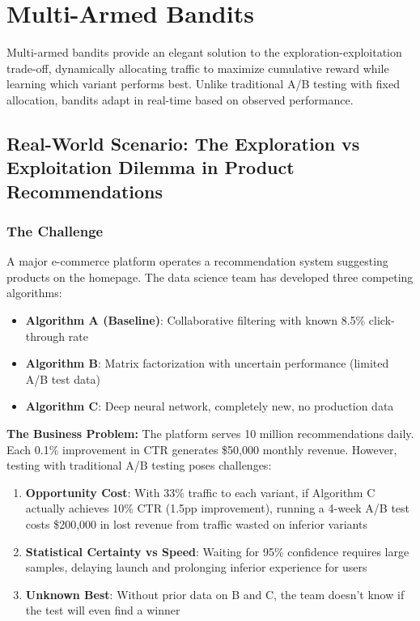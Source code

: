 \section{Multi-Armed Bandits}

Multi-armed bandits provide an elegant solution to the exploration-exploitation trade-off, dynamically allocating traffic to maximize cumulative reward while learning which variant performs best. Unlike traditional A/B testing with fixed allocation, bandits adapt in real-time based on observed performance.

\subsection{Real-World Scenario: The Exploration vs Exploitation Dilemma in Product Recommendations}

\subsubsection{The Challenge}

A major e-commerce platform operates a recommendation system suggesting products on the homepage. The data science team has developed three competing algorithms:

\begin{itemize}
    \item \textbf{Algorithm A (Baseline)}: Collaborative filtering with known 8.5\% click-through rate
    \item \textbf{Algorithm B}: Matrix factorization with uncertain performance (limited A/B test data)
    \item \textbf{Algorithm C}: Deep neural network, completely new, no production data
\end{itemize}

\textbf{The Business Problem:} The platform serves 10 million recommendations daily. Each 0.1\% improvement in CTR generates \$50,000 monthly revenue. However, testing with traditional A/B testing poses challenges:

\begin{enumerate}
    \item \textbf{Opportunity Cost}: With 33\% traffic to each variant, if Algorithm C actually achieves 10\% CTR (1.5pp improvement), running a 4-week A/B test costs \$200,000 in lost revenue from traffic wasted on inferior variants
    \item \textbf{Statistical Certainty vs Speed}: Waiting for 95\% confidence requires large samples, delaying launch and prolonging inferior experience for users
    \item \textbf{Unknown Best}: Without prior data on B and C, the team doesn't know if the test will even find a winner
\end{enumerate}

